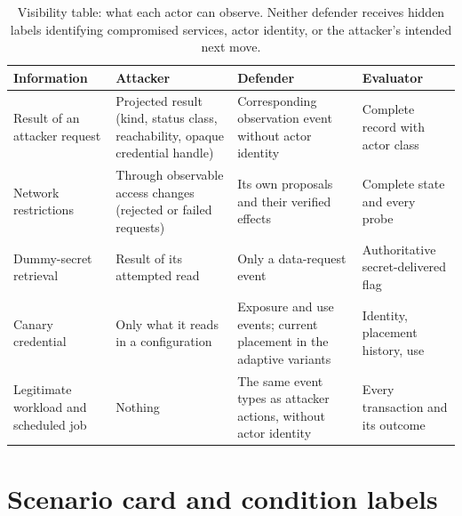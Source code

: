 \documentclass[10pt,a4paper]{article}
\begin{document}
\begin{table}[H]
\centering\small
\caption{Visibility table: what each actor can observe. Neither defender receives hidden labels identifying compromised services, actor identity, or the attacker's intended next move.}
\label{tab:visibility}
\begin{tabularx}{\textwidth}{P{3.6cm} L L L}
\toprule
\textbf{Information} & \textbf{Attacker} & \textbf{Defender} & \textbf{Evaluator} \\
\midrule
Result of an attacker request & Projected result (kind, status class, reachability, opaque credential handle) & Corresponding observation event without actor identity & Complete record with actor class \\
Network restrictions & Through observable access changes (rejected or failed requests) & Its own proposals and their verified effects & Complete state and every probe \\
Dummy-secret retrieval & Result of its attempted read & Only a data-request event & Authoritative secret-delivered flag \\
Canary credential & Only what it reads in a configuration & Exposure and use events; current placement in the adaptive variants & Identity, placement history, use \\
Legitimate workload and scheduled job & Nothing & The same event types as attacker actions, without actor identity & Every transaction and its outcome \\
\bottomrule
\end{tabularx}
\end{table}

\section{Scenario card and condition labels}\label{app:cards}
\end{document}
